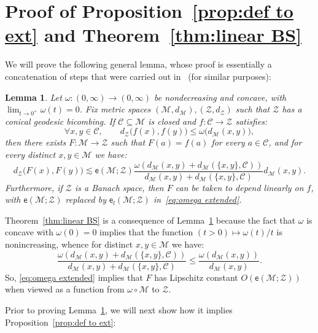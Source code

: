 \documentclass[11pt,reqno]{amsart}
\newtheorem{lemma}[theorem]{Lemma}
\renewcommand{\le}{\leqslant}
\renewcommand{\subset}{\subseteq}
\newcommand{\ee}{\mathsf{e}}
\newcommand{\cZ}{\mathcal{Z}}
\newcommand{\MM}{\mathcal{M}}
\newcommand{\sub}{\mathscr{C}}
\begin{document}
\section{Proof of Proposition~\ref{prop:def to ext} and Theorem~\ref{thm:linear BS} }\label{sec:deH to ext}


We will prove the following general lemma, whose proof is essentially a concatenation of steps that were carried out in~\cite{Nao01,LN05,Nao24} (for similar purposes):


\begin{lemma}\label{lem:two scales} Let $\omega:(0,\infty)\to (0,\infty)$ be nondecreasing and concave, with $\lim_{t\to 0^+}\omega(t)=0$. Fix  metric spaces $(\MM,d_\MM), (\cZ,d_\cZ)$ such that $\cZ$ has a conical geodesic bicombing. If $\sub\subset \MM$ is closed and $f:\sub\to \cZ$ satisfies:
\begin{equation}\label{eq:omega modulus}
\forall x,y\in \sub,\qquad d_\cZ\big(f(x),f(y)\big)\le \omega \big(d_\MM(x,y)\big),
\end{equation}
then there exists $F:\MM\to \cZ$ such that $F(a)=f(a)$ for every $a\in \sub$,  and for every distinct $x,y\in \MM$ we have:
\begin{equation}\label{eq:omega extended}
d_\cZ\big(F(x),F(y)\big)\lesssim \ee(\MM;\cZ)\frac{\omega\left(d_\MM(x,y)+d_\MM(\{x,y\},\sub)\right)}{d_\MM(x,y)+d_\MM(\{x,y\},\sub)}d_\MM(x,y).
\end{equation}
Furthermore, if $\cZ$ is a Banach space, then $F$ can be taken to depend linearly on $f$, with $\ee(\MM;\cZ)$ replaced by $\ee_l(\MM;\cZ)$ in~\eqref{eq:omega extended}.  
\end{lemma}

Theorem~\ref{thm:linear BS} is a consequence of Lemma~\ref{lem:two scales} because the fact that $\omega$ is concave with $\omega(0)=0$ implies that the function $(t>0)\mapsto \omega(t)/t$ is nonincreasing, whence  for distinct $x,y\in \MM$ we have:
 $$
\frac{\omega\left(d_\MM(x,y)+d_\MM(\{x,y\},\sub)\right)}{d_\MM(x,y)+d_\MM(\{x,y\},\sub)}\le \frac{\omega\left(d_\MM(x,y)\right)}{d_\MM(x,y)}.
$$ So, \eqref{eq:omega extended}  implies that $F$ has Lipschitz constant $O(\ee(\MM;\cZ))$ when viewed as a function from $\omega\circ \MM$ to $\cZ$. 


Prior to proving Lemma~\ref{lem:two scales}, we will next  show how it implies Proposition~\ref{prop:def to ext}: 
\end{document}
